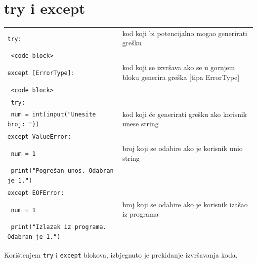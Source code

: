 \documentclass[10pt]{article}
\begin{document}
    \section*{\color{NavyBlue} try i except}
    \begin{tabular}{|>{\tt}p{9.00cm}|>{}p{15.50cm}|}
        \hline
        try: & kod koji bi potencijalno mogao generirati grešku 
        \\
        \hspace{5mm} {<code block>} & 
        \\
        except [ErrorType]: & kod koji se izvršava ako se u gornjem bloku generira greška [tipa ErrorType]
        \\
        \hspace{5mm} {<code block>} & 
        \\ \hline
        \hline
        try: &
        \\
        \hspace{5mm} num = int(input("Unesite broj: ")) & kod koji će generirati grešku ako korisnik unese string
        \\
        except ValueError: &
        \\
        \hspace{5mm} num = 1 & broj koji se odabire ako je korisnik unio string
        \\
        \hspace{5mm} print("Pogrešan unos. Odabran je 1.") &
        \\
        except EOFError: &
        \\
        \hspace{5mm} num = 1 & broj koji se odabire ako je korisnik izašao iz programa
        \\
        \hspace{5mm} print("Izlazak iz programa. Odabran je 1.") &
        \\ \hline
    \end{tabular}
    \begin{center}
        Korištenjem \texttt{try} i \texttt{except} blokova, izbjegnuto je prekidanje izvršavanja koda. 
    \end{center}
\end{document}
